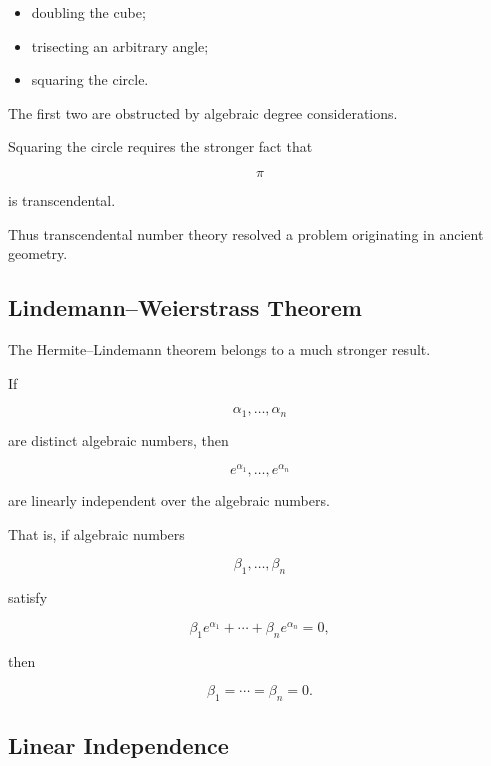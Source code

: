 \begin{itemize}
    \item doubling the cube;
    \item trisecting an arbitrary angle;
    \item squaring the circle.
\end{itemize}

The first two are obstructed by algebraic degree considerations.

Squaring the circle requires the stronger fact that

\[ \pi \]

is transcendental.

Thus transcendental number theory resolved a problem originating in ancient
geometry.

\subsection{Lindemann--Weierstrass Theorem}
\label{subsec:lindemann-weierstrass}

The Hermite--Lindemann theorem belongs to a much stronger result.

\begin{theorem}
If

\[ \alpha_1,\ldots,\alpha_n \]

are distinct algebraic numbers, then

\[ \boxed{e^{\alpha_1},\ldots,e^{\alpha_n}} \]

are linearly independent over the algebraic numbers.
\end{theorem}

That is, if algebraic numbers

\[ \beta_1,\ldots,\beta_n \]

satisfy

\[ \beta_1e^{\alpha_1}+\cdots+\beta_ne^{\alpha_n}=0, \]

then

\[ \beta_1=\cdots=\beta_n=0. \]

\subsection{Linear Independence}
\label{subsec:linear-independence-transcendence}

